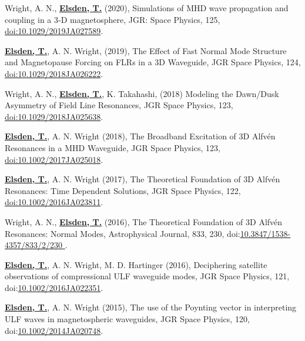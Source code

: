 \documentclass[11pt,a4paper]{article} %
\newcommand\vs{\vspace{-0.25cm}}
\begin{document}
\begin{etaremune}
\vs
\item Wright, A. N., \underline{\textbf{Elsden, T.}} (2020), Simulations of MHD wave propagation and coupling in a 3‐D magnetosphere, JGR: Space Physics, 125,  {\href{https://doi.org/10.1029/2019JA027589}{doi:10.1029/2019JA027589}}.

\vs
\item \underline{\textbf{Elsden, T.}}, A. N. Wright, (2019), The Effect of Fast Normal Mode Structure and Magnetopause Forcing on FLRs in a 3D Waveguide, JGR Space Physics, 124, {\href{https://doi.org/10.1029/2018JA026222}{doi:10.1029/2018JA026222}}.

\vs
\item Wright, A. N., \underline{\textbf{Elsden, T.}}, K. Takahashi, (2018) Modeling the Dawn/Dusk Asymmetry of Field Line Resonances, JGR Space Physics, 123, {\href{https://doi.org/10.1029/2018JA025638}{doi:10.1029/2018JA025638}}.

\vs
\item \underline{\textbf{Elsden, T.}}, A. N. Wright (2018),  The Broadband Excitation of 3D Alfv\'{e}n Resonances in a MHD Waveguide, JGR Space Physics, 123, {\href{https://doi.org/10.1002/2017JA025018}{doi:10.1002/2017JA025018}}.

\vs
\item \underline{\textbf{Elsden, T.}}, A. N. Wright (2017), The Theoretical Foundation of 3D Alfv\'{e}n Resonances: Time Dependent Solutions, JGR Space Physics, 122, {\href{http://onlinelibrary.wiley.com/doi/10.1002/2016JA023811/full}{doi:10.1002/2016JA023811}}.

\vs
\item Wright, A. N., \underline{\textbf{Elsden, T.}} (2016), The Theoretical Foundation of 3D Alfv\'{e}n Resonances: Normal Modes, Astrophysical Journal, 833, 230, doi:{\href{http://iopscience.iop.org/article/10.3847/1538-4357/833/2/230}{10.3847/1538-4357/833/2/230 }}.

\vs
\item \underline{\textbf{Elsden, T.}}, A. N. Wright, M. D. Hartinger (2016), Deciphering satellite observations of compressional ULF waveguide modes, JGR Space Physics, 121, \newline doi:{\href{http://onlinelibrary.wiley.com/doi/10.1002/2016JA022351/full}{10.1002/2016JA022351}}.

\vs
\item \underline{\textbf{Elsden, T.}}, A. N. Wright (2015), The use of the Poynting vector in interpreting ULF waves in magnetospheric waveguides, JGR Space Physics, 120, doi:{\href{http://onlinelibrary.wiley.com/doi/10.1002/2014JA020748/abstract}{10.1002/2014JA020748}}.

\end{etaremune}





\end{document}
